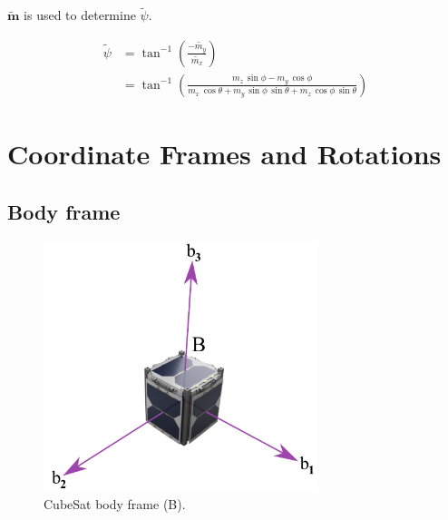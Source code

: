 \documentclass[12pt, a4paper]{article}
\begin{document}
$\tilde{\bm{m}}$ is used to determine $\tilde{\psi}$.

\begin{equation}
\begin{split}
\tilde{\psi} &= \tan^{-1}{\left(\frac{-\tilde{m_{y}}}{\tilde{m_{x}}}\right)} \\
&= \tan^{-1}{\left(\frac{m_z\,\sin{\phi} - m_y\,\cos{\phi}}{m_x\,\cos{\theta} + m_y\,\sin{\phi}\,\sin{\theta} +  m_z\,\cos{\phi}\,\sin{\theta}}\right)}
\end{split}
\end{equation}






\appendix
{}

\section{Coordinate Frames and Rotations}
\label{sec_frames_rotation}

\subsection{Body frame}

\begin{figure}[h] 
    \centering
    \includegraphics[width=8cm]{figs/fig_body.png}
    \caption{CubeSat body frame (B).}
    \label{fig_body}
\end{figure}
\end{document}
